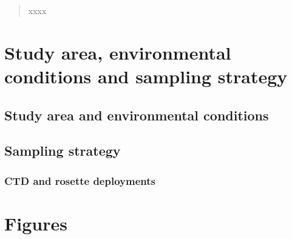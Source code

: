 \documentclass[essd, manuscript]{copernicus}
\begin{document}


\received{}
\pubdiscuss{} %
\revised{}
\accepted{}
\published{}



\maketitle

\begin{abstract}
	xxxx
\end{abstract}


\introduction  %

\section{Study area, environmental conditions and sampling strategy}

\subsection{Study area and environmental conditions}

\subsection{Sampling strategy}

\subsubsection{CTD and rosette deployments}

\newpage

\section{Figures}
\end{document}
